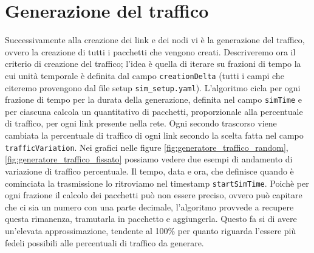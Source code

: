 \documentclass[binding=0.6cm]{sapthesis}
\begin{document}
\section{Generazione del traffico}
Successivamente alla creazione dei link e dei nodi vi è la generazione del traffico, ovvero la creazione di tutti i pacchetti che vengono
creati. Descriveremo ora il criterio di creazione del traffico; l'idea è quella di iterare su frazioni di tempo la cui unità temporale è definita
 dal campo \texttt{creationDelta} (tutti i campi che citeremo provengono dal file setup \texttt{sim\_setup.yaml}). L'algoritmo cicla per ogni frazione di 
 tempo per la durata della generazione, definita nel campo
 \texttt{simTime} e per ciascuna calcola un quantitativo di pacchetti, proporzionale alla 
percentuale di traffico, per ogni link presente nella rete. Ogni secondo trascorso viene cambiata la percentuale di traffico di ogni link secondo
la scelta fatta nel campo \texttt{trafficVariation}. Nei grafici nelle figure \ref{fig:generatore_traffico_random}, \ref{fig:generatore_traffico_fissato} possiamo vedere due esempi di andamento di variazione di traffico percentuale.
Il tempo, data e ora, che definisce quando è cominciata la trasmissione lo ritroviamo nel timestamp \texttt{startSimTime}.
Poichè per ogni frazione il calcolo dei pacchetti può non essere preciso, ovvero può capitare che ci sia un numero con una parte decimale, l'algoritmo
provvede a recupere questa rimanenza, tramutarla in pacchetto e aggiungerla. Questo fa si di avere un'elevata approssimazione, tendente al 100\% per
quanto riguarda l'essere più fedeli possibili alle percentuali di traffico da generare.
\end{document}
